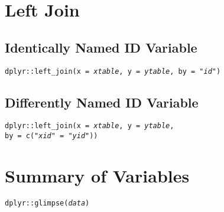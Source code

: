 \documentclass{tufte-handout}
\newenvironment{subs}
  {\adjustwidth{1em}{0pt}}
  {\endadjustwidth}
\begin{document}
\section{Left Join}
\begin{subs}
\subsection{Identically Named ID Variable}
\texttt{dplyr::}{\color{red}\texttt{left\_join}}\texttt{(x = \textit{xtable}, y = \textit{ytable}, by = "\textit{id}")}

\vspace{3mm}
\subsection{Differently Named ID Variable}
\texttt{dplyr::}{\color{red}\texttt{left\_join}}\texttt{(x = \textit{xtable}, y = \textit{ytable}, \\by = c("\textit{xid}" = "\textit{yid}"))}

\end{subs}

\vspace{5mm}
\section{Summary of Variables}
\texttt{dplyr::}{\color{red}\texttt{glimpse}}\texttt{(\textit{data})}
\end{document}
